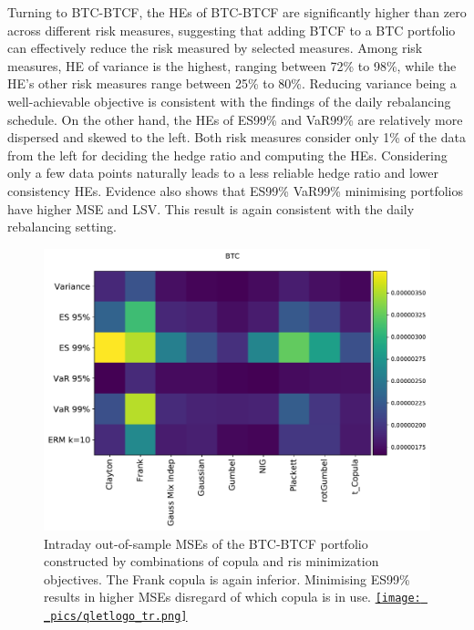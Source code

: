 \documentclass[11pt,a4paper,english]{article}
\begin{document}
Turning to BTC-BTCF, the HEs of BTC-BTCF are
significantly higher than zero across different risk measures,
suggesting that adding BTCF to a BTC portfolio can effectively reduce
the risk measured by selected measures.
Among risk measures, HE of variance is the highest, ranging between 72\% to 98\%, while the
  HE's other risk measures range between 25\% to 80\%.
Reducing variance being a well-achievable objective is
consistent with the findings of the daily rebalancing schedule.
On the other hand, the HEs of ES99\% and VaR99\% are relatively more dispersed and skewed to the left.
Both risk measures consider only 1\% of the data from the left for deciding the hedge ratio and computing the HEs.
Considering only a few data points naturally leads to a less reliable hedge ratio and lower consistency HEs.
Evidence also shows that ES99\% VaR99\% minimising portfolios have higher MSE and LSV.
This result is again consistent with the daily rebalancing setting.


\begin{figure}[t]
  \begin{center}
    \includegraphics[width=.65\textwidth]{_pics/intraday_BTC_MSEs.pdf}
  \end{center}
  \caption{Intraday out-of-sample MSEs of the BTC-BTCF portfolio constructed by combinations of copula and ris minimization objectives.
    The Frank copula is again inferior. Minimising ES99\% results in higher MSEs disregard of which copula is in use.
  \href{https://github.com/QuantLet/Hedging-Cryptos-with-Bitcoin-Futures/blob/main/newToQuantlet/Pynotebooks/figures/intraday/gen_MSEs_LSVs.ipynb}{\texttt{[image: \_pics/qletlogo\_tr.png]}}
}
\label{fig:BTC_MSE}
\end{figure}
\end{document}
